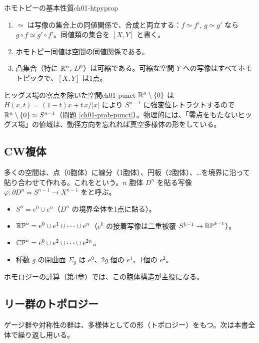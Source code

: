 \begin{mythm}{ホモトピーの基本性質}{ch01-htpyprop}
\begin{enumerate}
\item $\simeq$ は写像の集合上の同値関係で、合成と両立する：$f\simeq f'$, $g\simeq g'$ なら $g\circ f\simeq g'\circ f'$。同値類の集合を $[X,Y]$ と書く。
\item ホモトピー同値は空間の同値関係である。
\item 凸集合（特に $\mathbb{R}^n$, $D^n$）は可縮である。可縮な空間 $Y$ への写像はすべてホモトピックで、$[X,Y]$ は1点。
\end{enumerate}
\end{mythm}

\begin{myex}{ヒッグス場の零点を除いた空間}{ch01-punct}
$\mathbb{R}^n\setminus\{0\}$ は $H(x,t)=(1-t)x+t\,x/\lvert x\rvert$ により $S^{n-1}$ に強変位レトラクトするので $\mathbb{R}^n\setminus\{0\}\simeq S^{n-1}$（問題 \ref{ch01-prob-punct}）。物理的には、「零点をもたないヒッグス場」の値域は、動径方向を忘れれば真空多様体の形をしている。
\end{myex}

\subsection{CW複体}
多くの空間は、点（0胞体）に線分（1胞体）、円板（2胞体）、…を境界に沿って貼り合わせて作れる。これをという。$n$ 胞体 $D^n$ を貼る写像 $\varphi\colon\partial D^n=S^{n-1}\to X^{n-1}$ をと呼ぶ。
\begin{itemize}
\item $S^n=e^0\cup e^n$（$D^n$ の境界全体を1点に貼る）。
\item $\mathbb{RP}^n=e^0\cup e^1\cup\dots\cup e^n$（$e^k$ の接着写像は二重被覆 $S^{k-1}\to\mathbb{RP}^{k-1}$）。
\item $\mathbb{CP}^n=e^0\cup e^2\cup\dots\cup e^{2n}$。
\item 種数 $g$ の閉曲面 $\Sigma_g$ は $e^0$、$2g$ 個の $e^1$、1個の $e^2$。
\end{itemize}
ホモロジーの計算（第4章）では、この胞体構造が主役になる。

\subsection{リー群のトポロジー}
ゲージ群や対称性の群は、多様体としての形（トポロジー）をもつ。次は本書全体で繰り返し用いる。

